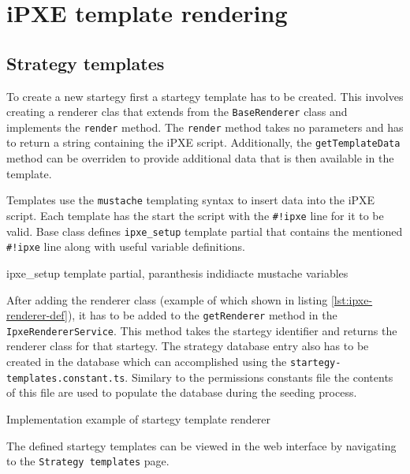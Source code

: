 \documentclass[../main.tex]{subfiles}
\begin{document}
\section{iPXE template rendering}

\subsection{Strategy templates}

To create a new startegy first a startegy template has to be created. This involves creating a renderer clas that extends from the \texttt{BaseRenderer} class and implements the \texttt{render} method.
The \texttt{render} method takes no parameters and has to return a string containing the iPXE script. Additionally, the \texttt{getTemplateData} method can be overriden to provide additional
data that is then available in the template.

Templates use the \texttt{mustache} templating syntax to insert data into the iPXE script.
Each template has the start the script with the \texttt{\#!ipxe} line for it to be valid.
Base class defines \texttt{ipxe\_setup} template partial that contains the mentioned \texttt{\#!ipxe} line along with useful variable definitions.

\begin{listing}[H]
  \caption{ipxe\_setup template partial, paranthesis indidiacte mustache variables}
\end{listing}

After adding the renderer class (example of which shown in listing \ref{lst:ipxe-renderer-def}), it has to be added to the \texttt{getRenderer} method in the \texttt{IpxeRendererService}.
This method takes the startegy identifier and returns the renderer class for that startegy. The strategy database entry also has to be created in the database which can accomplished
using the \texttt{startegy-templates.constant.ts}. Similary to the permissions constants file the contents of this file are used to populate the database during the seeding process.

\begin{listing}[H]
  \caption{Implementation example of startegy template renderer}
  \label{lst:ipxe-renderer-def}
\end{listing}

The defined startegy templates can be viewed in the web interface by navigating to the \texttt{Strategy templates} page.
\end{document}
